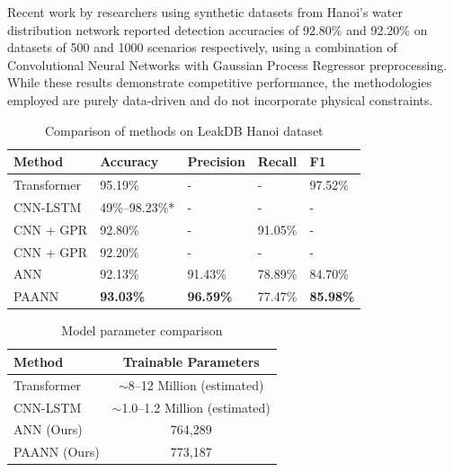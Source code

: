 \documentclass[final,5p,times,twocolumn,authoryear]{elsarticle}
\begin{document}
Recent work by researchers using synthetic datasets from Hanoi's water distribution network reported detection accuracies of 92.80\% and 92.20\% on datasets of 500 and 1000 scenarios respectively, using a combination of Convolutional Neural Networks with Gaussian Process Regressor preprocessing. While these results demonstrate competitive performance, the methodologies employed are purely data-driven and do not incorporate physical constraints.

\begin{table}[!htbp]
\centering
\caption{Comparison of methods on LeakDB Hanoi dataset}
\label{tab:benchmark_comparison}
\begin{tabular}{@{}lllll@{}}
\toprule
\textbf{Method} & \textbf{Accuracy} & \textbf{Precision} & \textbf{Recall} & \textbf{F1} \\
\midrule
Transformer & 95.19\% & - & - & 97.52\% \\ 
CNN-LSTM  & 49\%--98.23\%* & - & - & - \\
CNN + GPR  & 92.80\% & - & 91.05\% & - \\
CNN + GPR  & 92.20\% & - & - & - \\
ANN & 92.13\% & 91.43\% & 78.89\% & 84.70\% \\
PAANN & \textbf{93.03\%} & \textbf{96.59\%} & 77.47\% & \textbf{85.98\%} \\
\bottomrule
\end{tabular}
\end{table}

\begin{table}[!htbp]
\centering
\caption{Model parameter comparison}
\label{tab:parameter_comparison}
\begin{tabular}{@{}lc@{}}
\toprule
\textbf{Method} & \textbf{Trainable Parameters} \\
\midrule
Transformer & $\sim$8--12 Million (estimated) \\
CNN-LSTM & $\sim$1.0--1.2 Million (estimated) \\
ANN (Ours) & 764,289 \\
PAANN (Ours) & 773,187 \\
\bottomrule
\end{tabular}
\end{table}
\end{document}
